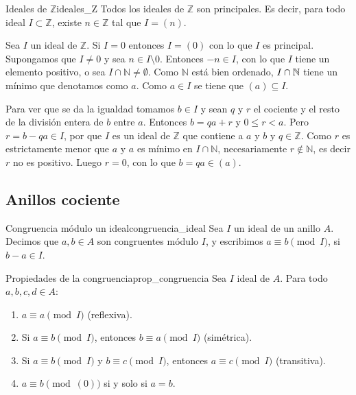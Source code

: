 \begin{proposition}{Ideales de \(\mathbb{Z}\)}{ideales_Z}
    Todos los ideales de \(\mathbb{Z}\) son principales. Es decir, para todo ideal \(I \subset \mathbb{Z}\), existe \(n \in \mathbb{Z}\) tal que \(I = (n)\).
\end{proposition}

\begin{proofbox}
    Sea \(I\) un ideal de \(\mathbb{Z}\). Si \(I=0\) entonces \(I=(0)\) con lo que \(I\) es principal. Supongamos que \(I\neq 0\) y sea \(n\in I\setminus 0\). Entonces \(-n\in I\), con lo que \(I\) tiene un elemento positivo, o sea \(I\cap\mathbb{N}\neq\emptyset\). Como \(\mathbb{N}\) está bien ordenado, \(I \cap \mathbb{N}\) tiene un mínimo que denotamos como \(a\). Como \(a\in I\) se tiene que \((a)\subseteq I\).
    
    Para ver que se da la igualdad tomamos \(b\in I\) y sean \(q\) y \(r\) el cociente y el resto de la división entera de \(b\) entre \(a\). Entonces \(b=qa+r\) y \(0\leq r<a\). Pero \(r=b-qa\in I\), por que \(I\) es un ideal de \(\mathbb{Z}\) que contiene a \(a\) y \(b\) y \(q\in\mathbb{Z}\). Como \(r\) es estrictamente menor que \(a\) y \(a\) es mínimo en \(I\cap\mathbb{N}\), necesariamente \(r\not\in\mathbb{N}\), es decir \(r\) no es positivo. Luego \(r=0\), con lo que \(b=qa\in(a)\).
\end{proofbox}

\subsection{Anillos cociente}

\begin{definition}{Congruencia módulo un ideal}{congruencia_ideal}
    Sea \(I\) un ideal de un anillo \(A\). Decimos que \(a, b \in A\) son {congruentes módulo \(I\)}, y escribimos \(a \equiv b \pmod{I}\), si \(b - a \in I\).
\end{definition}

\begin{lemma}{Propiedades de la congruencia}{prop_congruencia}
    Sea \(I\) ideal de \(A\). Para todo \(a, b, c, d \in A\):
    \begin{enumerate}
        \item \(a \equiv a \pmod{I}\) (reflexiva).
        \item Si \(a \equiv b \pmod{I}\), entonces \(b \equiv a \pmod{I}\) (simétrica).
        \item Si \(a \equiv b \pmod{I}\) y \(b \equiv c \pmod{I}\), entonces \(a \equiv c \pmod{I}\) (transitiva).
        \item \(a \equiv b \pmod{(0)}\) si y solo si \(a = b\).
    \end{enumerate}
\end{lemma}

